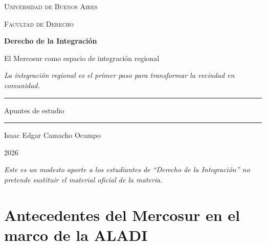 \documentclass[12pt,oneside]{book}
\newcommand{\universidad}{Universidad de Buenos Aires}
\newcommand{\facultad}{Facultad de Derecho}
\newcommand{\materia}{Derecho de la Integración}
\newcommand{\titulo}{El Mercosur como espacio de integración regional}
\newcommand{\autor}{Isaac Edgar Camacho Ocampo}
\newcommand{\anio}{2026}
\begin{document}
\begin{titlepage}

\thispagestyle{empty}

\begin{center}

\vspace*{1cm}

{\large \textsc{\universidad}}

\vspace{0.2cm}

{\large \textsc{\facultad}}

\vspace{3cm}

{\Huge \textbf{\materia}}

\vspace{1cm}

{\LARGE \titulo}

\vspace{0.8cm}

\textit{La integración regional es el primer paso para transformar la vecindad en comunidad.}

\vspace{1.2cm}

\rule{0.70\textwidth}{0.5pt}

\vspace{0.5cm}

{\large Apuntes de estudio}

\vspace{0.5cm}

\rule{0.70\textwidth}{0.5pt}

\vfill

{\large \autor}

\vspace{0.3cm}

{\large \anio}

\end{center}

\vfill

\begin{flushleft}
\textit{Este es un modesto aporte a los estudiantes de ``Derecho de la Integración'' no pretende sustituir el material oficial de la materia.}
\end{flushleft}

\end{titlepage}

\tableofcontents
\newpage

\chapter{Antecedentes del Mercosur en el marco de la ALADI}
\end{document}
